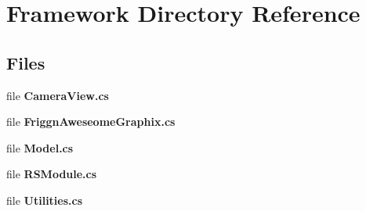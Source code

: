 \section{Framework Directory Reference}
\label{dir_bcbb2cf9a3d3d83e5515c82071a07177}
\subsection*{Files}
\begin{DoxyCompactItemize}
\item 
file \textbf{ Camera\+View.\+cs}
\item 
file \textbf{ Friggn\+Aweseome\+Graphix.\+cs}
\item 
file \textbf{ Model.\+cs}
\item 
file \textbf{ R\+S\+Module.\+cs}
\item 
file \textbf{ Utilities.\+cs}
\end{DoxyCompactItemize}
